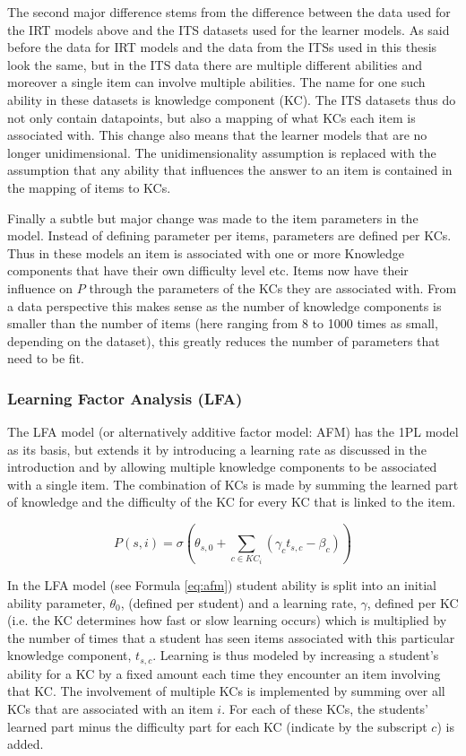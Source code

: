 \documentclass{scrartcl}
\begin{document}
The second major difference stems from the difference between the data used for the IRT models above and the ITS datasets used for the learner models. As said before the data for IRT models and the data from the ITSs used in this thesis look the same, but in the ITS data there are multiple different abilities and moreover a single item can involve multiple abilities. The name for one such ability in these datasets is knowledge component (KC). The ITS datasets thus do not only contain datapoints, but also a mapping of what KCs each item is associated with.
This change also means that the learner models that are no longer unidimensional. The unidimensionality assumption is replaced with the assumption that any ability that influences the answer to an item is contained in the mapping of items to KCs.

Finally a subtle but major change was made to the item parameters in the model. Instead of defining parameter per items, parameters are defined per KCs. Thus in these models an item is associated with one or more Knowledge components that have their own difficulty level etc. Items now have their influence on $P$ through the parameters of the KCs they are associated with. From a data perspective this makes sense as the number of knowledge components is smaller than the number of items (here ranging from 8 to 1000 times as small, depending on the dataset), this greatly reduces the number of parameters that need to be fit. 

\subsubsection{Learning Factor Analysis (LFA)}
\label{sec:AFM}
The LFA model (or alternatively additive factor model: AFM) has the 1PL model as its basis, but extends it by introducing a learning rate as discussed in the introduction and by allowing multiple knowledge components to be associated with a single item. The combination of KCs is made by summing the learned part of knowledge and the difficulty of the KC for every KC that is linked to the item.

\begin{equation}
\label{eq:afm}
P(s,i) = \sigma(\theta_{s,0} + \sum_{c \in KC_{i}}(\gamma_{c} t_{s,c} - \beta_{c}))
\end{equation}

In the LFA model (see Formula \ref{eq:afm}) student ability is split into an initial ability parameter, $\theta_{0}$, (defined per student) and a learning rate, $\gamma$, defined per KC (i.e. the KC determines how fast or slow learning occurs) which is  multiplied by the number of times that a student has seen items associated with this particular knowledge component, $t_{s,c}$. Learning is thus modeled by increasing a student's ability for a KC by a fixed amount each time they encounter an item involving that KC. The involvement of multiple KCs is implemented by summing over all KCs that are associated with an item $i$. For each of these KCs, the students' learned part minus the difficulty part for each KC (indicate by the subscript $c$) is added.  
\end{document}
